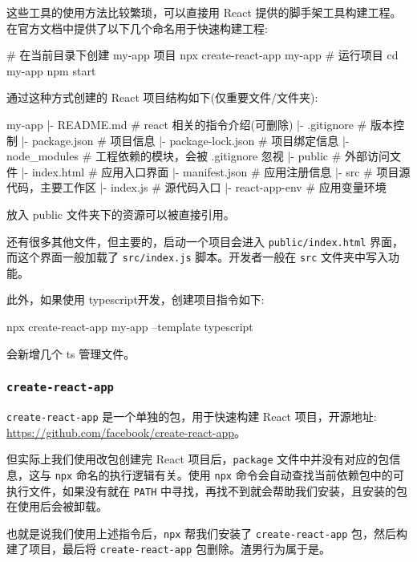 这些工具的使用方法比较繁琐，可以直接用 React 提供的脚手架工具构建工程。在官方文档中提供了以下几个命名用于快速构建工程:

\begin{bash}
# 在当前目录下创建 my-app 项目
npx create-react-app my-app
# 运行项目
cd my-app
npm start
\end{bash}

通过这种方式创建的 React 项目结构如下(仅重要文件/文件夹):

\begin{bash}
my-app
|- README.md            # react 相关的指令介绍(可删除)
|- .gitignore           # 版本控制
|- package.json         # 项目信息
|- package-lock.json    # 项目绑定信息
|- node_modules         # 工程依赖的模块，会被 .gitignore 忽视
|- public               # 外部访问文件
    |- index.html       # 应用入口界面
    |- manifest.json    # 应用注册信息
|- src              # 项目源代码，主要工作区
    |- index.js     # 源代码入口
    |- react-app-env    # 应用变量环境
\end{bash}

放入 public 文件夹下的资源可以被直接引用。

还有很多其他文件，但主要的，启动一个项目会进入 \texttt{public/index.html} 界面，而这个界面一般加载了 \texttt{src/index.js} 脚本。开发者一般在 \texttt{src} 文件夹中写入功能。

此外，如果使用 typescript开发，创建项目指令如下:

\begin{bash}
npx create-react-app my-app --template typescript
\end{bash}

会新增几个 ts 管理文件。

\subsubsection*{\texttt{create-react-app}}

\texttt{create-react-app} 是一个单独的包，用于快速构建 React 项目，开源地址: \url{https://github.com/facebook/create-react-app}。

但实际上我们使用改包创建完 React 项目后，\texttt{package} 文件中并没有对应的包信息，这与 \texttt{npx} 命名的执行逻辑有关。使用 \texttt{npx} 命令会自动查找当前依赖包中的可执行文件，如果没有就在 \texttt{PATH} 中寻找，再找不到就会帮助我们安装，且安装的包在使用后会被卸载。

也就是说我们使用上述指令后，\texttt{npx} 帮我们安装了 \texttt{create-react-app} 包，然后构建了项目，最后将 \texttt{create-react-app} 包删除。渣男行为属于是。

